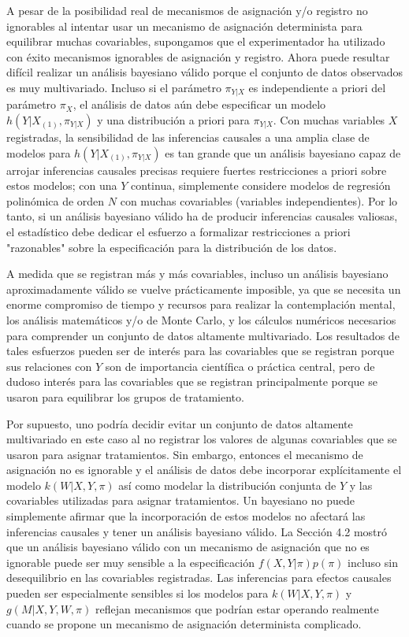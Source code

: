 \documentclass[12pt,a4paper]{article}
\begin{document}
A pesar de la posibilidad real de mecanismos de asignación y/o registro no ignorables al intentar usar un mecanismo de asignación determinista para equilibrar muchas covariables, supongamos que el experimentador ha utilizado con éxito mecanismos ignorables de asignación y registro. Ahora puede resultar difícil realizar un análisis bayesiano válido porque el conjunto de datos observados es muy multivariado. Incluso si el parámetro $\pi_{Y|X}$ es independiente a priori del parámetro $\pi_X$, el análisis de datos aún debe especificar un modelo $h(Y|X_{(1)},\pi_{Y|X})$ y una distribución a priori para $\pi_{Y|X}$. Con muchas variables $X$ registradas, la sensibilidad de las inferencias causales a una amplia clase de modelos para $h(Y|X_{(1)},\pi_{Y|X})$ es tan grande que un análisis bayesiano capaz de arrojar inferencias causales precisas requiere fuertes restricciones a priori sobre estos modelos; con una $Y$ continua, simplemente considere modelos de regresión polinómica de orden $N$ con muchas covariables (variables independientes). Por lo tanto, si un análisis bayesiano válido ha de producir inferencias causales valiosas, el estadístico debe dedicar el esfuerzo a formalizar restricciones a priori "razonables" sobre la especificación para la distribución de los datos.

A medida que se registran más y más covariables, incluso un análisis bayesiano aproximadamente válido se vuelve prácticamente imposible, ya que se necesita un enorme compromiso de tiempo y recursos para realizar la contemplación mental, los análisis matemáticos y/o de Monte Carlo, y los cálculos numéricos necesarios para comprender un conjunto de datos altamente multivariado.  Los resultados de tales esfuerzos pueden ser de interés para las covariables que se registran porque sus relaciones con $Y$ son de importancia científica o práctica central, pero de dudoso interés para las covariables que se registran principalmente porque se usaron para equilibrar los grupos de tratamiento. 

Por supuesto, uno podría decidir evitar un conjunto de datos altamente multivariado en este caso al no registrar los valores de algunas covariables que se usaron para asignar tratamientos. Sin embargo, entonces el mecanismo de asignación no es ignorable y el análisis de datos debe incorporar explícitamente el modelo $k(W|X,Y,\pi)$ así como modelar la distribución conjunta de $Y$ y las covariables utilizadas para asignar tratamientos. Un bayesiano no puede simplemente afirmar que la incorporación de estos modelos no afectará las inferencias causales y tener un análisis bayesiano válido. La Sección 4.2 mostró que un análisis bayesiano válido con un mecanismo de asignación que no es ignorable puede ser muy sensible a la especificación $f(X,Y|\pi)p(\pi)$ incluso sin desequilibrio en las covariables registradas. Las inferencias para efectos causales pueden ser especialmente sensibles si los modelos para $k(W|X,Y,\pi)$ y $g(M|X,Y,W,\pi)$ reflejan mecanismos que podrían estar operando realmente cuando se propone un mecanismo de asignación determinista complicado. 
\end{document}
